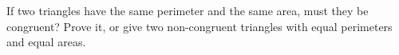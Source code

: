 If two triangles have the same perimeter and the same area, must they be congruent? Prove it, or give two non-congruent triangles with equal perimeters and equal areas.
